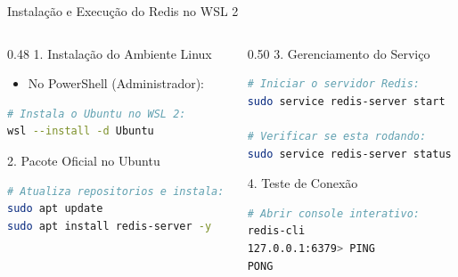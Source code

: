 \begin{frame}[fragile]{Instalação e Execução do Redis no WSL 2}
  \begin{columns}[T]
    \begin{column}{0.48\textwidth}
      \alert{1. Instalação do Ambiente Linux}\par
      \begin{itemize}
        \item No PowerShell (Administrador):
      \end{itemize}
      \begin{lstlisting}[language=bash]
# Instala o Ubuntu no WSL 2:
wsl --install -d Ubuntu
      \end{lstlisting}
      \vspace{0.1cm}
      \alert{2. Pacote Oficial no Ubuntu}\par
      \begin{lstlisting}[language=bash]
# Atualiza repositorios e instala:
sudo apt update
sudo apt install redis-server -y
      \end{lstlisting}
    \end{column}
    \begin{column}{0.50\textwidth}
      \alert{3. Gerenciamento do Serviço}\par
      \begin{lstlisting}[language=bash]
# Iniciar o servidor Redis:
sudo service redis-server start

# Verificar se esta rodando:
sudo service redis-server status
      \end{lstlisting}
      \vspace{0.1cm}
      \alert{4. Teste de Conexão}\par
      \begin{lstlisting}[language=bash]
# Abrir console interativo:
redis-cli
127.0.0.1:6379> PING
PONG
      \end{lstlisting}
    \end{column}
  \end{columns}
\end{frame}

